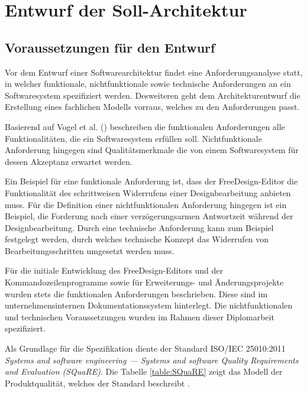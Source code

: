 \section{Entwurf der Soll-Architektur}

\subsection{Voraussetzungen für den Entwurf}
Vor dem Entwurf einer Softwarearchitektur findet eine Anforderungsanalyse statt, in welcher funktionale, nichtfunktionale sowie technische Anforderungen an ein Softwaresystem spezifiziert werden. Desweiteren geht dem Architekturentwurf die Erstellung eines fachlichen Modells vorraus, welches zu den Anforderungen passt. \autocite[vgl.][S. 58 - 59]{Posch2007}

Basierend auf Vogel et al. (\citeyear[vgl.][S. 113 - 114]{Vogel2009}) beschreiben die funktionalen Anforderungen alle Funktionalitäten, die ein Softwaresystem erfüllen soll. Nichtfunktionale Anforderung hingegen sind Qualitätsmerkmale die von einem Softwaresystem für dessen Akzeptanz erwartet werden. 

Ein Beispiel für eine funktionale Anforderung ist, dass der FreeDesign-Editor die Funktionalität des schrittweisen Widerrufens einer Designbearbeitung anbieten muss. 
Für die Definition einer nichtfunktionalen Anforderung hingegen ist ein Beispiel, die Forderung nach einer verzögerungsarmen Antwortzeit während der Designbearbeitung.
Durch eine technische Anforderung kann zum Beispiel festgelegt werden, durch welches technische Konzept das Widerrufen von Bearbeitungsschritten umgesetzt werden muss. 

Für die initiale Entwicklung des FreeDesign-Editors und der Kommandozeilenprogramme sowie für Erweiterungs- und Änderungsprojekte wurden stets die funktionalen Anforderungen beschrieben. Diese sind im unternehmensinternen Dokumentationssystem hinterlegt. 
Die nichtfunktionalen und technischen Voraussetzungen wurden im Rahmen dieser Diplomarbeit spezifiziert. 

Als Grundlage für die Spezifikation diente der Standard ISO/IEC 25010:2011 \emph{Systems and software engineering — Systems and software Quality Requirements and Evaluation (SQuaRE)}. 
Die Tabelle \ref{table:SQuaRE} zeigt das Modell der Produktqualität, welches der Standard beschreibt \autocite[vgl.][S. 10]{ISO25010}. 

